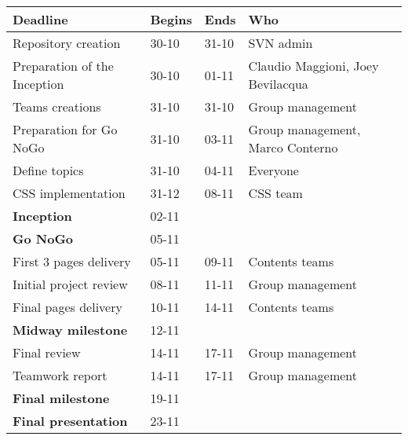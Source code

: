 \documentclass[hidelinks,12pt,a4paper,numbers=enddot]{scrartcl}
\begin{document}
\begin{table}[h]
\begin{tabular}{l l l l}

\textbf{Deadline} & \textbf{Begins} & \textbf{Ends} & \textbf{Who}\\\hline

Repository creation & 30-10 & 31-10 & SVN admin\\
Preparation of the Inception & 30-10 & 01-11 & Claudio Maggioni, Joey Bevilacqua\\
Teams creations & 31-10 & 31-10 & Group management\\
Preparation for Go NoGo & 31-10 & 03-11 & Group management, Marco Conterno\\
Define topics & 31-10 & 04-11 & Everyone\\
CSS implementation & 31-12 & 08-11 & CSS team\\
\textbf{Inception} & 02-11 & & \\
\textbf{Go NoGo} & 05-11 & & \\
First 3 pages delivery & 05-11 & 09-11 & Contents teams\\
Initial project review & 08-11 & 11-11 & Group management\\
Final pages delivery & 10-11 & 14-11 & Contents teams\\
\textbf{Midway milestone} & 12-11 & & \\
Final review & 14-11 & 17-11 & Group management\\
Teamwork report & 14-11 & 17-11 & Group management\\
\textbf{Final milestone} & 19-11 & & \\
\textbf{Final presentation} & 23-11 & &

\end{tabular}
\end{table}
\end{document}
